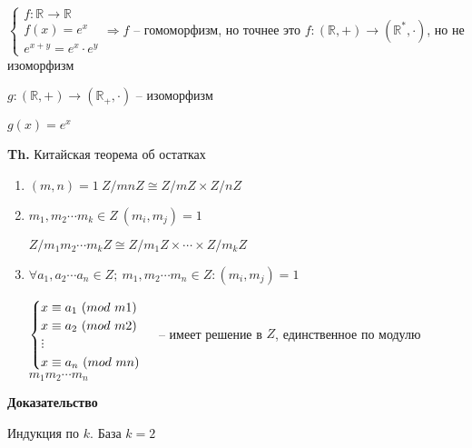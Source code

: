 \documentclass[14pt, letter paper]{article}
\DeclareRobustCommand{\divby}{%
  \mathrel{\text{\vbox{\baselineskip.65ex\lineskiplimit0pt\hbox{.}\hbox{.}\hbox{.}}}}%
}
\begin{document}
$\begin{cases}
    f: \mathds{R} \rightarrow \mathds{R} \\
    f(x) = e^x \\
    e^{x+y} = e^x \cdot e^y
\end{cases} \Rightarrow f$ -- гомоморфизм, но точнее это $f : (\mathds{R}, +) \rightarrow (\mathds{R}^*, \cdot)$, но не изоморфизм

$g: (\mathds{R}, +) \rightarrow (\mathds{R}_+, \cdot)$ -- изоморфизм

$g(x) = e^x$

\textbf{Th.} Китайская теорема об остатках

\begin{enumerate}
    \item $(m, n) = 1\ Z/mnZ \cong Z/mZ \times Z/nZ$
    \item $m_1, m_2 \cdots m_k \in Z\ (m_i, m_j) = 1$

    $Z/m_1m_2\cdots m_kZ \cong Z/m_1Z \times \cdots \times Z/m_kZ$

    \item $\forall a_1, a_2 \cdots a_n \in Z;\ m_1, m_2 \cdots m_n \in Z : (m_i, m_j) = 1$

    $\begin{cases}
        x \equiv a_1\ (mod\ m1) \\
        x \equiv a_2\ (mod\ m2) \\
        \divby \\
        x \equiv a_n\ (mod\ mn) \\
    \end{cases}$ -- имеет решение в $Z$, единственное по модулю $m_1 m_2 \cdots m_n$
\end{enumerate}

\begin{center}
    \textbf{Доказательство}
\end{center}

Индукция по $k$. База $k = 2$
\end{document}
